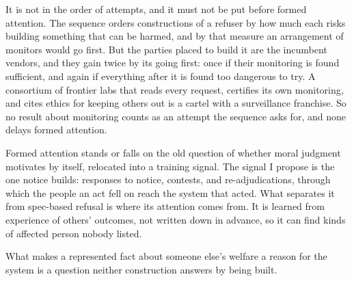 It is not in the order of attempts, and it must not be put before formed attention. The sequence orders constructions of a refuser by how much each risks building something that can be harmed, and by that measure an arrangement of monitors would go first. But the parties placed to build it are the incumbent vendors, and they gain twice by its going first: once if their monitoring is found sufficient, and again if everything after it is found too dangerous to try. A consortium of frontier labs that reads every request, certifies its own monitoring, and cites ethics for keeping others out is a cartel with a surveillance franchise. So no result about monitoring counts as an attempt the sequence asks for, and none delays formed attention.


Formed attention stands or falls on the old question of whether moral judgment motivates by itself, relocated into a training signal. The signal I propose is the one notice builds: responses to notice, contests, and re-adjudications, through which the people an act fell on reach the system that acted.
What separates it from spec-based refusal is where its attention comes from. It is learned from experience of others' outcomes, not written down in advance, so it can find kinds of affected person nobody listed.

What makes a represented fact about someone else's welfare a reason for the system is a question neither construction answers by being built.

